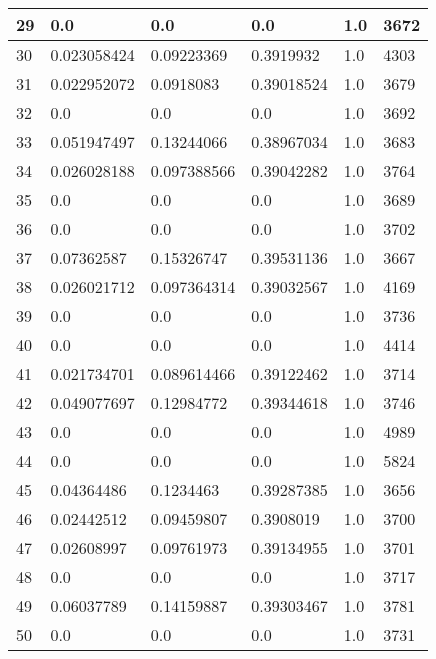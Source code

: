 \begin{longtable}{|l|l|l|l|l|l|}
29 & 0.0 & 0.0 & 0.0 & 1.0 & 3672 \\ \hline 
30 & 0.023058424 & 0.09223369 & 0.3919932 & 1.0 & 4303 \\ \hline 
31 & 0.022952072 & 0.0918083 & 0.39018524 & 1.0 & 3679 \\ \hline 
32 & 0.0 & 0.0 & 0.0 & 1.0 & 3692 \\ \hline 
33 & 0.051947497 & 0.13244066 & 0.38967034 & 1.0 & 3683 \\ \hline 
34 & 0.026028188 & 0.097388566 & 0.39042282 & 1.0 & 3764 \\ \hline 
35 & 0.0 & 0.0 & 0.0 & 1.0 & 3689 \\ \hline 
36 & 0.0 & 0.0 & 0.0 & 1.0 & 3702 \\ \hline 
37 & 0.07362587 & 0.15326747 & 0.39531136 & 1.0 & 3667 \\ \hline 
38 & 0.026021712 & 0.097364314 & 0.39032567 & 1.0 & 4169 \\ \hline 
39 & 0.0 & 0.0 & 0.0 & 1.0 & 3736 \\ \hline 
40 & 0.0 & 0.0 & 0.0 & 1.0 & 4414 \\ \hline 
41 & 0.021734701 & 0.089614466 & 0.39122462 & 1.0 & 3714 \\ \hline 
42 & 0.049077697 & 0.12984772 & 0.39344618 & 1.0 & 3746 \\ \hline 
43 & 0.0 & 0.0 & 0.0 & 1.0 & 4989 \\ \hline 
44 & 0.0 & 0.0 & 0.0 & 1.0 & 5824 \\ \hline 
45 & 0.04364486 & 0.1234463 & 0.39287385 & 1.0 & 3656 \\ \hline 
46 & 0.02442512 & 0.09459807 & 0.3908019 & 1.0 & 3700 \\ \hline 
47 & 0.02608997 & 0.09761973 & 0.39134955 & 1.0 & 3701 \\ \hline 
48 & 0.0 & 0.0 & 0.0 & 1.0 & 3717 \\ \hline 
49 & 0.06037789 & 0.14159887 & 0.39303467 & 1.0 & 3781 \\ \hline 
50 & 0.0 & 0.0 & 0.0 & 1.0 & 3731 \\ \hline 
\end{longtable}